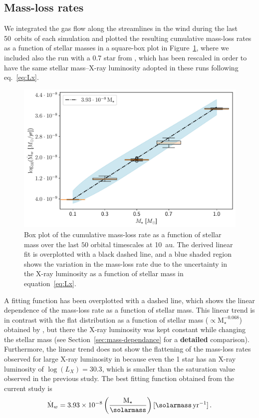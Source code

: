 \documentclass[usenatbib,useAMS,usedcolumn]{mnras}
\begin{document}
\subsection{Mass-loss rates}\label{sec:mdot}
We integrated the gas flow along the streamlines in the wind during the last \SI{50}{orbits} of each simulation and plotted the resulting cumulative mass-loss rates as a function of stellar masses in a square-box plot in Figure~\ref{fig:Mdot}, where we included also the run with a \SI{0.7}{\solarmass} star from , which has been rescaled in order to have the same stellar mass--X-ray luminosity adopted in these runs following eq.~\ref{eq:Lx}.
\begin{figure}
  \includegraphics[width=\columnwidth]{Figure6}
  \caption{Box plot of the cumulative mass-loss rate as a function of stellar mass over the last $50$ orbital timescales at \SI{10}{\astronomicalunit}. The derived linear fit is overplotted with a black dashed line, and a blue shaded region shows the variation in the mass-loss rate due to the uncertainty in the X-ray luminosity as a function of stellar mass in equation~\ref{eq:Lx}. \label{fig:Mdot}}
\end{figure}
A fitting function has been overplotted with a dashed line, which shows the linear dependence of the mass-loss rate as a function of stellar mass. This linear trend is in contrast with the flat distribution as a function of stellar mass ($\propto \mathrm{M}_\star^{-0.068}$) obtained by , but there the X-ray luminosity was kept constant while changing the stellar mass (see Section~\ref{sec:mass-dependance} for a \textbf{detailed} comparison). Furthermore, the linear trend does not show the flattening of the mass-loss rates observed for large X-ray luminosity in  because even the \SI{1}{\solarmass} star has an X-ray luminosity of $\log(L_X) = 30.3$, which is smaller than the saturation value observed in the previous study.
The best fitting function obtained from the current study is
\begin{equation}\label{eq:MdotLxMass}
  \dot{\mathrm{M}}_w = 3.93\times10^{-8} \left(\frac{\mathrm{M}_\star}{\si{\solarmass}}\right) [\si{\solarmass.yr^{-1}}]\,.
\end{equation}
\end{document}
